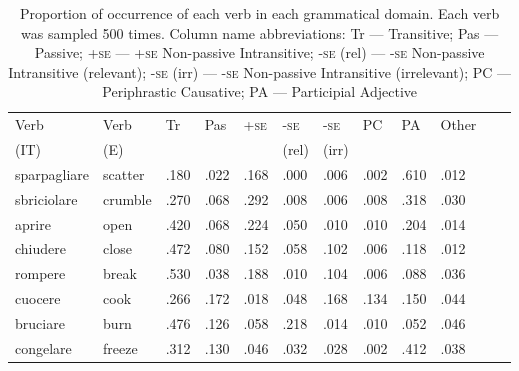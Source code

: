 \documentclass[output=paper,colorlinks,citecolor=brown
]{langscibook}
\begin{document}
\begin{table}[H]
\label{tab:table5}
\caption{Proportion of occurrence of each verb in each grammatical domain. Each verb was sampled 500 times. Column name abbreviations: Tr — Transitive; Pas — Passive; +\textsc{se} — +\textsc{se} Non-passive Intransitive; -\textsc{se} (rel) — -\textsc{se} Non-passive Intransitive (relevant); -\textsc{se} (irr) — -\textsc{se} Non-passive Intransitive (irrelevant); PC — Periphrastic Causative; PA — Participial Adjective}
\begin{tabular}{llllllllllll}
\lsptoprule
Verb & Verb & Tr & Pas & +\textsc{se} & -\textsc{se} & -\textsc{se} & PC & PA & Other\\
(IT) & (E) &  &  &  & (rel) & (irr) & & & \\
\midrule
sparpagliare & scatter  & .180     & .022   & .168                       & .000                                   & .006                                     & .002                  & .610                & .012  \\
sbriciolare  & crumble  & .270     & .068   & .292                       & .008                                   & .006                                     & .008                  & .318                & .030   \\
aprire       & open     & .420     & .068   & .224                       & .050                                   & .010                                     & .010                  & .204                & .014  \\
chiudere     & close    & .472     & .080   & .152                       & .058                                   & .102                                    & .006                  & .118                & .012   \\
rompere      & break    & .530     & .038   & .188                       & .010                                   & .104                                    & .006                  & .088                 & .036  \\
cuocere      & cook     & .266     & .172  & .018                        & .048                                   & .168                                    & .134                 & .150                & .044  \\
bruciare     & burn     & .476     & .126  & .058                        & .218                                  & .014                                     & .010                  & .052                 & .046  \\
congelare    & freeze   & .312     & .130  & .046                        & .032                                   & .028                                     & .002                  & .412                & .038  \\

\end{tabular}
\end{table}
\end{document}
